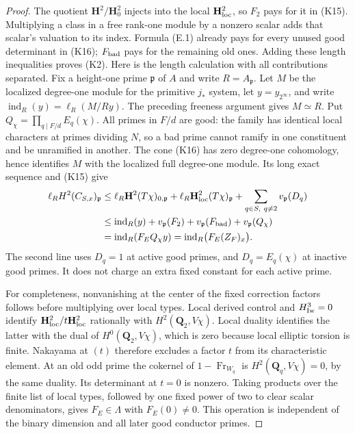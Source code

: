 \documentclass[11pt]{article}
\theoremstyle{definition}
\theoremstyle{remark}
\begin{document}
\begin{proof}
The quotient $\mathbf H^2/\mathbf H^2_0$ injects into the local
$\mathbf H^2_{\rm loc}$, so $F_2$ pays for it in (K15).
Multiplying a class in a free rank-one module by a nonzero scalar
adds that scalar's valuation to its index. Formula (E.1) already
pays for every unused good determinant in (K16); $F_{\rm bad}$
pays for the remaining old ones. Adding these length inequalities
proves (K2).
Here is the length calculation with all contributions separated.
Fix a height-one prime $\mathfrak p$ of $A$ and write
$R=A_{\mathfrak p}$. Let $M$ be the localized degree-one module
for the primitive $j_*$ system, let $y=y_{2^\infty}$, and write
$\operatorname{ind}_R(y)=\ell_R(M/Ry)$.
The preceding freeness argument gives $M\simeq R$.
Put $Q_\chi=\prod_{q\mid F/d}E_q(\chi)$.
All primes in $F/d$ are good: the family has identical local
characters at primes dividing $N$, so a bad prime cannot ramify
in one constituent and be unramified in another.
The cone (K16) has zero degree-one cohomology, hence identifies
$M$ with the localized full degree-one module. Its long exact
sequence and (K15) give
\[
\begin{split}
 \ell_R H^2(C_{S,x})_{\mathfrak p}
 &\le \ell_R\mathbf H^2(T\chi)_{0,\mathfrak p}
       +\ell_R\mathbf H^2_{\rm loc}(T\chi)_{\mathfrak p}
       +\sum_{q\in S,\ q\ne2}v_{\mathfrak p}(D_q)\\
 &\le \operatorname{ind}_R(y)
       +v_{\mathfrak p}(F_2)+v_{\mathfrak p}(F_{\rm bad})
       +v_{\mathfrak p}(Q_\chi)\\
 &=\operatorname{ind}_R(F_EQ_\chi y)
  =\operatorname{ind}_R\bigl(F_E(Z_F)_x\bigr).
\end{split}
\]
The second line uses $D_q=1$ at active good primes, and
$D_q=E_q(\chi)$ at inactive good primes. It does not charge an
extra fixed constant for each active prime.

For completeness, nonvanishing at the center of the fixed
correction factors follows before multiplying over local types.
Local derived control and $H^3_{\rm Iw}=0$ identify
$\mathbf H^2_{\rm loc}/t\mathbf H^2_{\rm loc}$ rationally with
$H^2(\mathbf Q_2,V\chi)$. Local duality identifies the latter
with the dual of $H^0(\mathbf Q_2,V\chi)$, which is zero because
local elliptic torsion is finite. Nakayama at $(t)$ therefore
excludes a factor $t$ from its characteristic element.
At an old odd prime the cokernel of
$1-\operatorname{Fr}_{W_q}$ is $H^2(\mathbf Q_q,V\chi)=0$,
by the same duality. Its determinant at $t=0$ is nonzero.
Taking products over the finite list of local types, followed by
one fixed power of two to clear scalar denominators, gives
$F_E\in\Lambda$ with $F_E(0)\ne0$. This operation is independent
of the binary dimension and all later good conductor primes.



\end{proof}
\end{document}
